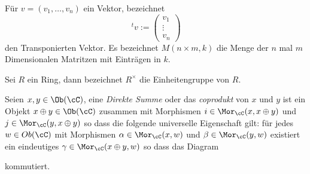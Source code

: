 Für $v=(v_1,\dots,v_n)$ ein Vektor, bezeichnet 
\[
\,^tv:= \begin{pmatrix}
  v_{1}\\
  \vdots\\
  v_{n}
\end{pmatrix}
\]
den Transponierten Vektor. Es bezeichnet $M(n\times m,k)$ die Menge der $n$ mal
$m$ Dimensionalen Matritzen mit Einträgen in $k$.

Sei $R$ ein Ring, dann bezeichnet $R^\times$ die Einheitengruppe von $R$.

\begin{defn} \cite[4(Categories).5.1]{stacks-project}
Seien $x,y\in \Ob(\cC)$, eine \emph{Direkte Summe} oder das \emph{coprodukt}
von $x$ und $y$ ist ein Objekt $x\oplus y\in \Ob(\cC)$ zusammen mit
Morphismen $i\in\Mor_\cC(x,x\oplus y)$ und $j\in\Mor_\cC(y,x\oplus y)$ so
dass die folgende universelle Eigenschaft gilt: für jedes $w\in Ob(\cC)$ mit
Morphismen $\alpha\in\Mor_\cC(x,w)$ und $\beta\in\Mor_\cC(y,w)$ existiert ein
eindeutiges $\gamma\in\Mor_\cC(x\oplus y,w)$ so dass das Diagram
\begin{center}
\end{center}
kommutiert.
\end{defn}


